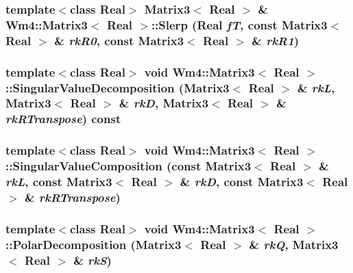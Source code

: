 \subsubsection{\setlength{\rightskip}{0pt plus 5cm}template$<$class Real$>$ {\bf Matrix3}$<$ Real $>$ \& {\bf Wm4::Matrix3}$<$ Real $>$::Slerp (Real {\em f\-T}, const {\bf Matrix3}$<$ Real $>$ \& {\em rk\-R0}, const {\bf Matrix3}$<$ Real $>$ \& {\em rk\-R1})}\label{classWm4_1_1Matrix3_e99ed2a428943d58d3acb6c8547cf05e}


\subsubsection{\setlength{\rightskip}{0pt plus 5cm}template$<$class Real$>$ void {\bf Wm4::Matrix3}$<$ Real $>$::Singular\-Value\-Decomposition ({\bf Matrix3}$<$ Real $>$ \& {\em rk\-L}, {\bf Matrix3}$<$ Real $>$ \& {\em rk\-D}, {\bf Matrix3}$<$ Real $>$ \& {\em rk\-RTranspose}) const}\label{classWm4_1_1Matrix3_9ead85bcc169be40d64c18b38f2c7e39}


\subsubsection{\setlength{\rightskip}{0pt plus 5cm}template$<$class Real$>$ void {\bf Wm4::Matrix3}$<$ Real $>$::Singular\-Value\-Composition (const {\bf Matrix3}$<$ Real $>$ \& {\em rk\-L}, const {\bf Matrix3}$<$ Real $>$ \& {\em rk\-D}, const {\bf Matrix3}$<$ Real $>$ \& {\em rk\-RTranspose})}\label{classWm4_1_1Matrix3_3ac8ceafb3372a3e231185a727fddd8a}


\subsubsection{\setlength{\rightskip}{0pt plus 5cm}template$<$class Real$>$ void {\bf Wm4::Matrix3}$<$ Real $>$::Polar\-Decomposition ({\bf Matrix3}$<$ Real $>$ \& {\em rk\-Q}, {\bf Matrix3}$<$ Real $>$ \& {\em rk\-S})}\label{classWm4_1_1Matrix3_a9a22eaf4eb0f2cc9fd27eb3f8ab8396}



